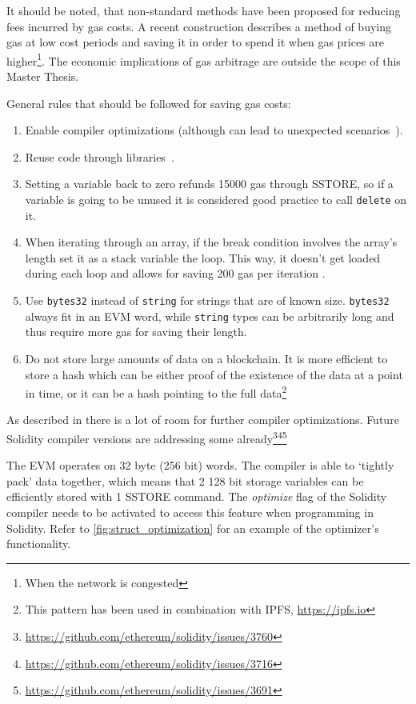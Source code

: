 It should be noted, that non-standard methods have been proposed for reducing fees incurred by gas costs. A recent construction \cite{gastoken} describes a method of buying gas at low cost periods and saving it in order to spend it when gas prices are higher\footnote{When the network is congested}. The economic implications of gas arbitrage are outside the scope of this Master Thesis. 

General rules that should be followed for saving gas costs:
\begin{enumerate}
    \item Enable compiler optimizations (although can lead to unexpected scenarios~\cite{compiler}).
    \item Reuse code through libraries~\cite{library}.
    \item Setting a variable back to zero refunds 15000 gas through SSTORE, so if a variable is going to be unused it is considered good practice to call \texttt{delete} on it. 
    \item When iterating through an array, if the break condition involves the array's length set it as a stack variable the loop. This way, it doesn't get loaded during each loop and allows for saving 200 gas per iteration \cite{DBLP:journals/corr/ChenLLZ17}.
    \item Use \texttt{bytes32} instead of \texttt{string} for strings that are of known size. \texttt{bytes32} always fit in an EVM word, while \texttt{string} types can be arbitrarily long and thus require more gas for saving their length.
    \item Do not store large amounts of data on a blockchain. It is more efficient to store a hash which can be either proof of the existence of the data at a point in time, or it can be a hash pointing to the full data\footnote{This pattern has been used in combination with IPFS, \url{https://ipfs.io}}
\end{enumerate}

As described in \cite{DBLP:journals/corr/ChenLLZ17} there is a lot of room for further compiler optimizations. Future Solidity compiler versions are addressing some already\footnote{\url{https://github.com/ethereum/solidity/issues/3760}}\footnote{\url{https://github.com/ethereum/solidity/issues/3716}}\footnote{\url{https://github.com/ethereum/solidity/issues/3691}}

The EVM operates on 32 byte (256 bit) words. The compiler is able to `tightly pack' data together, which means that 2 128 bit storage variables can be efficiently stored with 1 SSTORE command. The \textit{optimize} flag of the Solidity compiler needs to be activated to access this feature when programming in Solidity. Refer to \ref{fig:struct_optimization} for an example of the optimizer's functionality.

